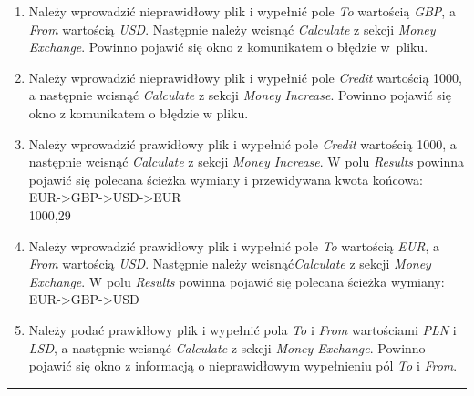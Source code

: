 \documentclass[a4paper,11pt]{article}
\newcommand{\linia}{\rule{\linewidth}{0.4mm}}
\begin{document}
\begin{enumerate}
\item Należy wprowadzić nieprawidłowy plik i wypełnić pole \textit{To} wartością \textit{GBP}, a \textit{From} wartością \textit{USD}. Następnie należy wcisnąć \textit{Calculate} z sekcji \textit{Money Exchange}. Powinno pojawić się okno z komunikatem o błędzie w~pliku.
\item Należy wprowadzić nieprawidłowy plik i wypełnić pole \textit{Credit} wartością 1000, a następnie wcisnąć \textit{Calculate} z sekcji \textit{Money Increase}. Powinno pojawić się okno z komunikatem o błędzie w pliku.
\item Należy wprowadzić prawidłowy plik i wypełnić pole \textit{Credit} wartością 1000, a następnie wcisnąć \textit{Calculate} z sekcji \textit{Money Increase}. W polu \textit{Results} powinna pojawić się polecana ścieżka wymiany i przewidywana kwota końcowa:
\\EUR->GBP->USD->EUR
\\1000,29
\item Należy wprowadzić prawidłowy plik i wypełnić pole \textit{To} wartością \textit{EUR}, a \textit{From} wartością \textit{USD}. Następnie należy wcisnąć\textit{Calculate} z sekcji \textit{Money Exchange}. W polu \textit{Results} powinna pojawić się polecana ścieżka wymiany:
\\EUR->GBP->USD
\item Należy podać prawidłowy plik i wypełnić pola \textit{To} i \textit{From} wartościami \textit{PLN} i \textit{LSD}, a następnie wcisnąć \textit{Calculate} z sekcji \textit{Money Exchange}. Powinno pojawić się okno z informacją o nieprawidłowym wypełnieniu pól \textit{To} i \textit{From}.
\end{enumerate}
\noindent\linia
\end{document}
